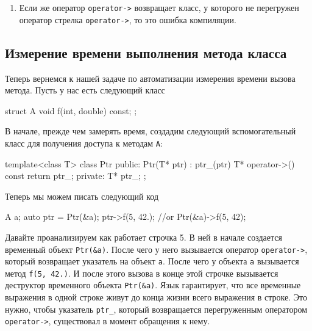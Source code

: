\begin{enumerate}
\item Если же оператор \verb"operator->" возвращает класс, у которого не перегружен оператор стрелка \verb"operator->", то это ошибка компиляции.
\end{enumerate}

\subsection{Измерение времени выполнения метода класса}

Теперь вернемся к нашей задаче по автоматизации измерения времени вызова метода.
Пусть у нас есть следующий класс
\begin{cppcode}
struct A {
  void f(int, double) const;
};
\end{cppcode}
В начале, прежде чем замерять время, создадим следующий вспомогательный класс для получения доступа к методам \verb"A":
\begin{cppcode}
template<class T>
class Ptr {
public:
  Ptr(T* ptr) : ptr_(ptr) {}
  T* operator->() const {
    return ptr_;
  }
private:
  T* ptr_;
};
\end{cppcode}
Теперь мы можем писать следующий код
\begin{cppcode}
A a;
auto ptr = Ptr(&a);
ptr->f(5, 42.);
//or
Ptr(&a)->f(5, 42);
\end{cppcode}
Давайте проанализируем как работает строчка 5.
В ней в начале создается временный объект \verb"Ptr(&a)".
После чего у него вызывается оператор \verb"operator->", который возвращает указатель на объект \verb"a".
После чего у объекта \verb"a" вызывается метод \verb"f(5, 42.)".
И после этого вызова в конце этой строчке вызывается деструктор временного объекта \verb"Ptr(&a)".
Язык гарантирует, что все временные выражения в одной строке живут до конца жизни всего выражения в строке.
Это нужно, чтобы указатель \verb"ptr_", который возвращается перегруженным оператором \verb"operator->", существовал в момент обращения к нему.

